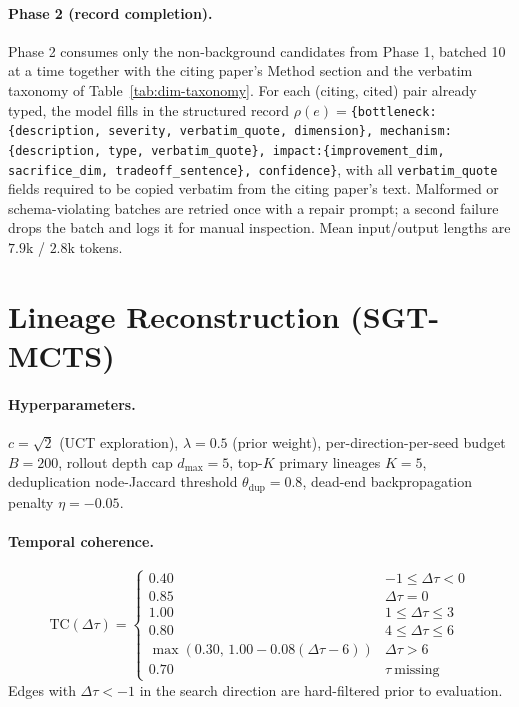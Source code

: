 \documentclass{opendatalab}
\begin{document}
\paragraph{Phase 2 (record completion).}
Phase 2 consumes only the non-background candidates from Phase 1, batched 10 at a time together with the citing paper's Method section and the verbatim taxonomy of Table~\ref{tab:dim-taxonomy}. For each (citing, cited) pair already typed, the model fills in the structured record $\rho(e)=$\texttt{\{bottleneck:\{description, severity, verbatim\_quote, dimension\}, mechanism:\{description, type, verbatim\_quote\}, impact:\{improvement\_dim, sacrifice\_dim, tradeoff\_sentence\}, confidence\}}, with all \texttt{verbatim\_quote} fields required to be copied verbatim from the citing paper's text. Malformed or schema-violating batches are retried once with a repair prompt; a second failure drops the batch and logs it for manual inspection. Mean input/output lengths are $7.9$k / $2.8$k tokens.


\section{Lineage Reconstruction (SGT-MCTS)}
\label{app:mcts}

\paragraph{Hyperparameters.}
$c=\sqrt{2}$ (UCT exploration), $\lambda=0.5$ (prior weight), per-direction-per-seed budget $B=200$, rollout depth
cap $d_{\max}=5$, top-$K$ primary lineages $K=5$, deduplication node-Jaccard threshold $\theta_{\text{dup}}=0.8$,
dead-end backpropagation penalty $\eta=-0.05$.

\paragraph{Temporal coherence.}
\begin{equation}
\mathrm{TC}(\Delta\tau)=
\begin{cases}
0.40 & -1\le\Delta\tau<0 \\
0.85 & \Delta\tau=0 \\
1.00 & 1\le\Delta\tau\le3 \\
0.80 & 4\le\Delta\tau\le6 \\
\max(0.30,\,1.00-0.08(\Delta\tau-6)) & \Delta\tau>6 \\
0.70 & \tau\ \text{missing}
\end{cases}
\label{eq:tc}
\end{equation}
Edges with $\Delta\tau<-1$ in the search direction are hard-filtered prior to evaluation.
\end{document}
